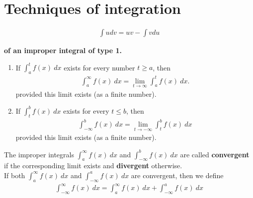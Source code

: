 \documentclass{article}
\begin{document}
\section{Techniques of integration}
\begin{theorem}
    \begin{align*}
        \int u dv = uv - \int v du
    \end{align*}
\end{theorem}
\begin{definition}
    \textbf{of an improper integral of type 1.}
    \begin{enumerate}
        \item If $\int_a^t f(x)\:dx$ exists for every number $t\geq a$, then
        \begin{align*}
            \int_a^\infty f(x)\:dx = \lim_{t\to \infty}\int_a^t f(x)\:dx.
        \end{align*}
        provided this limit exists (as a finite number).
        \item If $\int_t^b f(x)\:dx$ exists for every $t\leq b$, then
        \begin{align*}
            \int_{-\infty}^b f(x)\: dx = \lim_{t\to-\infty}\int_t^b f(x)\:dx
        \end{align*}
        provided this limit exists (as a finite number).
    \end{enumerate}
    The improper integrals $\int_a^\infty f(x)\:dx$ and $\int_{-\infty}^b f(x)\:dx$ are called \textbf{convergent} if the corresponding limit exists and \textbf{divergent} otherwise.\\
    If both  $\int_a^\infty f(x)\:dx$ and $\int_{-\infty}^a f(x)\:dx$ are convergent, then we define
    \begin{align*}
        \int_{-\infty}^\infty f(x)\:dx = \int_a^\infty f(x)\:dx + \int_{-\infty}^a f(x)\:dx
    \end{align*}
\end{definition}
\end{document}
